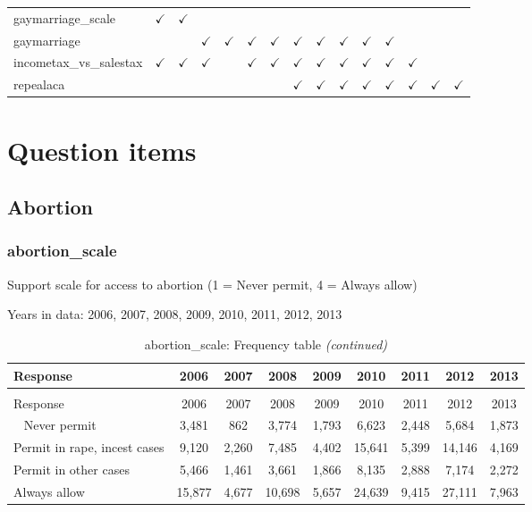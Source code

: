 \documentclass[12pt]{article}
\begin{document}
\begin{table}[H]
{\begin{tabular}{lcccccccccccccl}
gaymarriage\_scale & $\checkmark$ & $\checkmark$ &  &  &  &  &  &  &  &  &  &  &  & \\
gaymarriage &  &  & $\checkmark$ & $\checkmark$ & $\checkmark$ & $\checkmark$ & $\checkmark$ & $\checkmark$ & $\checkmark$ & $\checkmark$ & $\checkmark$ &  &  & \\
incometax\_vs\_salestax & $\checkmark$ & $\checkmark$ & $\checkmark$ &  & $\checkmark$ & $\checkmark$ & $\checkmark$ & $\checkmark$ & $\checkmark$ & $\checkmark$ & $\checkmark$ & $\checkmark$ &  & \\
repealaca &  &  &  &  &  &  & $\checkmark$ & $\checkmark$ & $\checkmark$ & $\checkmark$ & $\checkmark$ & $\checkmark$ & $\checkmark$ & $\checkmark$\\
\bottomrule
\end{tabular}}
\end{table}

\newpage

\section{Question items}\label{question-items}

\subsection{Abortion}\label{abortion}

\subsubsection{abortion\_scale}\label{abortion_scale}

Support scale for access to abortion (1 = Never permit, 4 = Always
allow)

Years in data: 2006, 2007, 2008, 2009, 2010, 2011, 2012,
2013\begingroup\fontsize{10}{12}\selectfont

\begin{longtable}[t]{lcccccccc}
\caption{\label{tab:unnamed-chunk-4}abortion\_scale: Frequency table}\\
\toprule
Response & 2006 & 2007 & 2008 & 2009 & 2010 & 2011 & 2012 & 2013\\
\midrule
\endfirsthead
\caption[]{abortion\_scale: Frequency table \textit{(continued)}}\\
\toprule
Response & 2006 & 2007 & 2008 & 2009 & 2010 & 2011 & 2012 & 2013\\
\midrule
\endhead
\
\endfoot
\bottomrule
\endlastfoot
Never permit & 3,481 & 862 & 3,774 & 1,793 & 6,623 & 2,448 & 5,684 & 1,873\\
Permit in rape, incest cases & 9,120 & 2,260 & 7,485 & 4,402 & 15,641 & 5,399 & 14,146 & 4,169\\
Permit in other cases & 5,466 & 1,461 & 3,661 & 1,866 & 8,135 & 2,888 & 7,174 & 2,272\\
Always allow & 15,877 & 4,677 & 10,698 & 5,657 & 24,639 & 9,415 & 27,111 & 7,963\\*
\end{longtable}
\end{document}
